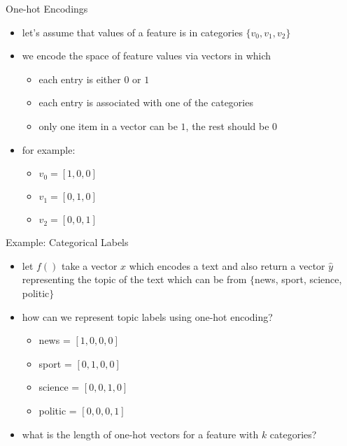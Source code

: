 \begin{frame}{One-hot Encodings}  
    \begin{itemize}
        \item<1-> let's assume that values of a feature is in categories $\{ v_0, v_1, v_2 \}$
        \item<2-> we encode the space of feature values via vectors in which 
            \begin{itemize}
                \item<3-> each entry is either $0$ or $1$
                \item<4-> each entry is associated with one of the categories
                \item<5-> only one item in a vector can be $1$, the rest should be $0$
            \end{itemize}
        \item<6-> for example:
        \begin{itemize}
            \item<6-> $v_0 = [1, 0, 0]$
            \item<6-> $v_1 = [0, 1, 0]$
            \item<6-> $v_2 = [0, 0, 1]$
        \end{itemize}
    \end{itemize}
\end{frame}
\begin{frame}{Example: Categorical Labels}
    \begin{itemize}
        \item<1-> let $f()$ take a vector $x$ which encodes a text and also return a vector $\hat{y}$ representing the topic of the text which can be from $\{$news, sport, science, politic$\}$
        \item<2-> how can we represent topic labels using one-hot encoding? 
        \begin{itemize}
            \item<3-> news = $[1,0,0,0]$
            \item<4-> sport = $[0,1,0,0]$
            \item<5-> science = $[0,0,1,0]$
            \item<6-> politic = $[0,0,0,1]$
        \end{itemize}
        \item<7-> what is the length of one-hot vectors for a feature with $k$ categories?  
        
    \end{itemize}
\end{frame}
